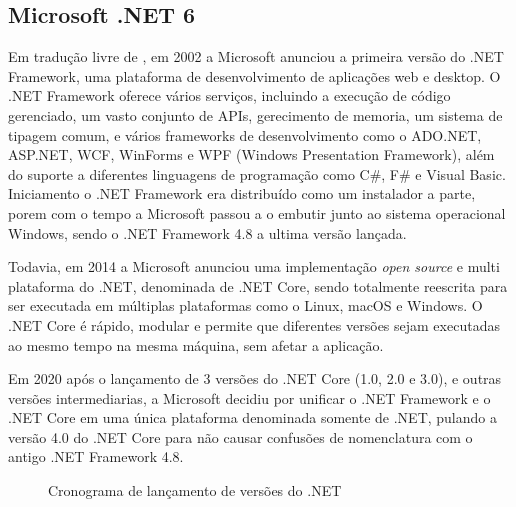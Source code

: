 \subsection{Microsoft .NET 6}

Em tradução livre de \cite{Akella:2022}, em 2002 a Microsoft anunciou a primeira
versão do .NET Framework, uma plataforma de desenvolvimento de aplicações
web e desktop. O .NET Framework oferece vários serviços, incluindo a
execução de código gerenciado, um vasto conjunto de APIs, gerecimento
de memoria, um sistema de tipagem comum, e vários frameworks de desenvolvimento
como o ADO.NET, ASP.NET, WCF, WinForms e WPF (Windows Presentation Framework),
além do suporte a diferentes linguagens de programação como C\#, F\# e Visual Basic.
Iniciamento o .NET Framework era distribuído como um instalador a parte, porem
com o tempo a Microsoft passou a o embutir junto ao sistema operacional Windows,
sendo o .NET Framework 4.8 a ultima versão lançada.

Todavia, em 2014 a Microsoft anunciou uma implementação \emph{open source} e
multi plataforma do .NET, denominada de .NET Core, sendo totalmente reescrita
para ser executada em múltiplas plataformas como o Linux, macOS e Windows.
O .NET Core é rápido, modular e permite que diferentes versões sejam
executadas ao mesmo tempo na mesma máquina, sem afetar a aplicação.

Em 2020 após o lançamento de 3 versões do .NET Core (1.0, 2.0 e 3.0), e outras
versões intermediarias, a Microsoft decidiu por unificar o .NET Framework e o
.NET Core em uma única plataforma denominada somente de .NET, pulando a
versão 4.0 do .NET Core para não causar confusões de nomenclatura
com o antigo .NET Framework 4.8.

\begin{figure}[H]
    \caption{Cronograma de lançamento de versões do .NET}
    \centering
    \label{fig:dotnet-release-schedule}
\end{figure}

